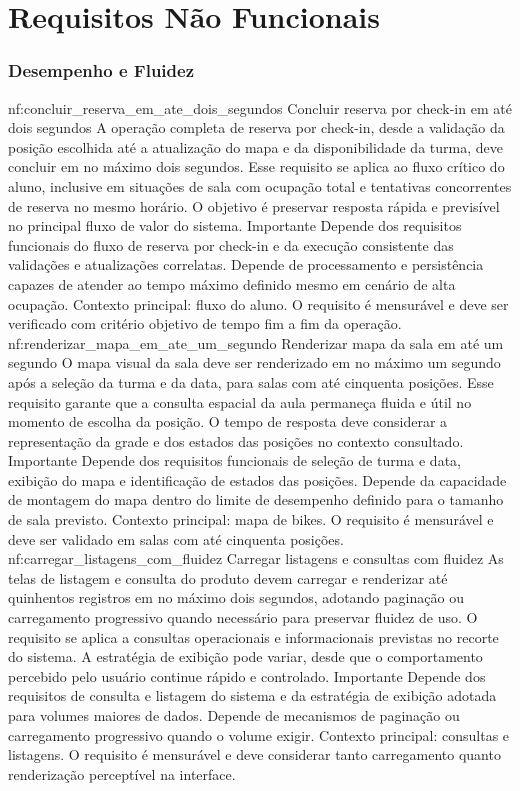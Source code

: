 \section{Requisitos Não Funcionais}

\subsubsection*{Desempenho e Fluidez}
\reqfuncfull
{nf:concluir_reserva_em_ate_dois_segundos}
{Concluir reserva por check-in em até dois segundos}
{A operação completa de reserva por check-in, desde a validação da posição escolhida até a atualização do mapa e da disponibilidade da turma, deve concluir em no máximo dois segundos. Esse requisito se aplica ao fluxo crítico do aluno, inclusive em situações de sala com ocupação total e tentativas concorrentes de reserva no mesmo horário. O objetivo é preservar resposta rápida e previsível no principal fluxo de valor do sistema.}
{Importante}
{Depende dos requisitos funcionais do fluxo de reserva por check-in e da execução consistente das validações e atualizações correlatas. Depende de processamento e persistência capazes de atender ao tempo máximo definido mesmo em cenário de alta ocupação.}
{Contexto principal: fluxo do aluno. O requisito é mensurável e deve ser verificado com critério objetivo de tempo fim a fim da operação.}
\reqfuncfull
{nf:renderizar_mapa_em_ate_um_segundo}
{Renderizar mapa da sala em até um segundo}
{O mapa visual da sala deve ser renderizado em no máximo um segundo após a seleção da turma e da data, para salas com até cinquenta posições. Esse requisito garante que a consulta espacial da aula permaneça fluida e útil no momento de escolha da posição. O tempo de resposta deve considerar a representação da grade e dos estados das posições no contexto consultado.}
{Importante}
{Depende dos requisitos funcionais de seleção de turma e data, exibição do mapa e identificação de estados das posições. Depende da capacidade de montagem do mapa dentro do limite de desempenho definido para o tamanho de sala previsto.}
{Contexto principal: mapa de bikes. O requisito é mensurável e deve ser validado em salas com até cinquenta posições.}
\reqfuncfull
{nf:carregar_listagens_com_fluidez}
{Carregar listagens e consultas com fluidez}
{As telas de listagem e consulta do produto devem carregar e renderizar até quinhentos registros em no máximo dois segundos, adotando paginação ou carregamento progressivo quando necessário para preservar fluidez de uso. O requisito se aplica a consultas operacionais e informacionais previstas no recorte do sistema. A estratégia de exibição pode variar, desde que o comportamento percebido pelo usuário continue rápido e controlado.}
{Importante}
{Depende dos requisitos de consulta e listagem do sistema e da estratégia de exibição adotada para volumes maiores de dados. Depende de mecanismos de paginação ou carregamento progressivo quando o volume exigir.}
{Contexto principal: consultas e listagens. O requisito é mensurável e deve considerar tanto carregamento quanto renderização perceptível na interface.}


